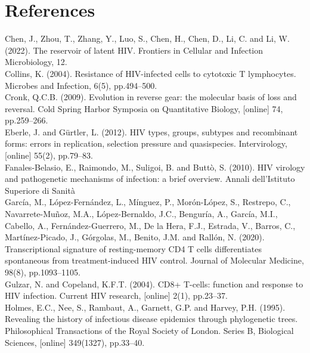 \chapter*{References}

Chen, J., Zhou, T., Zhang, Y., Luo, S., Chen, H., Chen, D., Li, C. and Li, W. (2022). The reservoir of latent HIV. Frontiers in Cellular and Infection Microbiology, 12.\\

Collins, K. (2004). Resistance of HIV-infected cells to cytotoxic T lymphocytes. Microbes and Infection, 6(5), pp.494–500.\\

Cronk, Q.C.B. (2009). Evolution in reverse gear: the molecular basis of loss and reversal. Cold Spring Harbor Symposia on Quantitative Biology, [online] 74, pp.259–266.\\

Eberle, J. and Gürtler, L. (2012). HIV types, groups, subtypes and recombinant forms: errors in replication, selection pressure and quasispecies. Intervirology, [online] 55(2), pp.79–83.\\

Fanales-Belasio, E., Raimondo, M., Suligoi, B. and Buttò, S. (2010). HIV virology and pathogenetic mechanisms of infection: a brief overview. Annali dell’Istituto Superiore di Sanità\\

García, M., López-Fernández, L., Mínguez, P., Morón-López, S., Restrepo, C., Navarrete-Muñoz, M.A., López-Bernaldo, J.C., Benguría, A., García, M.I., Cabello, A., Fernández-Guerrero, M., De la Hera, F.J., Estrada, V., Barros, C., Martínez-Picado, J., Górgolas, M., Benito, J.M. and Rallón, N. (2020). Transcriptional signature of resting-memory CD4 T cells differentiates spontaneous from treatment-induced HIV control. Journal of Molecular Medicine, 98(8), pp.1093–1105.\\

Gulzar,     N. and Copeland, K.F.T. (2004). CD8+ T-cells: function and response to HIV infection. Current HIV research, [online] 2(1), pp.23–37.\\

Holmes,       E.C., Nee, S., Rambaut, A., Garnett, G.P. and Harvey, P.H. (1995). Revealing the history of infectious disease epidemics through phylogenetic trees. Philosophical Transactions of the Royal Society of London. Series B, Biological Sciences, [online] 349(1327), pp.33–40. \\

